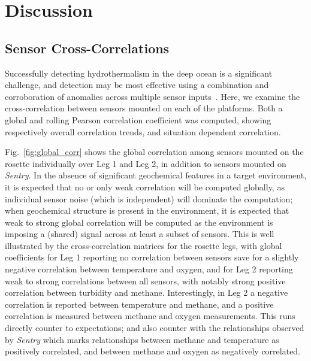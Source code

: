 \section{Discussion}

\subsection{Sensor Cross-Correlations}
\label{sec:correl}
Successfully detecting hydrothermalism in the deep ocean is a significant challenge, and detection may be most effective using a combination and corroboration of anomalies across multiple sensor inputs~\autocite{jakuba2007stochastic}. Here, we examine the cross-correlation between sensors mounted on each of the platforms. Both a global and rolling Pearson correlation coefficient was computed, showing respectively overall correlation trends, and situation dependent correlation.

Fig.~\ref{fig:global_corr} shows the global correlation among sensors mounted on the rosette individually over Leg 1 and Leg 2, in addition to sensors mounted on \emph{Sentry}. In the absence of significant geochemical features in a target environment, it is expected that no or only weak correlation will be computed globally, as individual sensor noise (which is independent) will dominate the computation; when geochemical structure is present in the environment, it is expected that weak to strong global correlation will be computed as the environment is imposing a (shared) signal across at least a subset of sensors. This is well illustrated by the cross-correlation matrices for the rosette legs, with global coefficients for Leg 1 reporting no correlation between sensors save for a slightly negative correlation between temperature and oxygen, and for Leg 2 reporting weak to strong correlations between all sensors, with notably strong positive correlation between turbidity and methane. Interestingly, in Leg 2 a negative correlation is reported between temperature and methane, and a positive correlation is measured between methane and oxygen measurements. This runs directly counter to expectations; and also counter with the relationships observed by \emph{Sentry} which marks relationships between methane and temperature as positively correlated, and between methane and oxygen as negatively correlated. 

